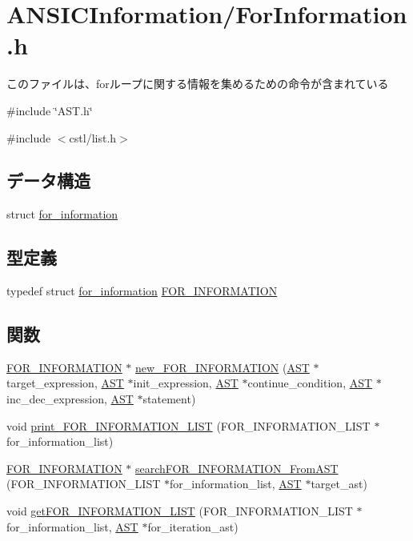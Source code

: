 \section{ANSICInformation/ForInformation.h}
\label{ForInformation_8h}


このファイルは、forループに関する情報を集めるための命令が含まれている  


{\ttfamily \#include \char`\"{}AST.h\char`\"{}}\par
{\ttfamily \#include $<$cstl/list.h$>$}\par
\subsection*{データ構造}
\begin{DoxyCompactItemize}
\item 
struct \hyperlink{structfor__information}{for\_\-information}
\end{DoxyCompactItemize}
\subsection*{型定義}
\begin{DoxyCompactItemize}
\item 
typedef struct \hyperlink{structfor__information}{for\_\-information} \hyperlink{ForInformation_8h_a2f30e4e2396ee1da23c3c282fbef2234}{FOR\_\-INFORMATION}
\end{DoxyCompactItemize}
\subsection*{関数}
\begin{DoxyCompactItemize}
\item 
\hyperlink{structfor__information}{FOR\_\-INFORMATION} $\ast$ \hyperlink{ForInformation_8h_a21a8cce7aba7cea3f56bbf3a6d84b14b}{new\_\-FOR\_\-INFORMATION} (\hyperlink{structabstract__syntax__tree}{AST} $\ast$target\_\-expression, \hyperlink{structabstract__syntax__tree}{AST} $\ast$init\_\-expression, \hyperlink{structabstract__syntax__tree}{AST} $\ast$continue\_\-condition, \hyperlink{structabstract__syntax__tree}{AST} $\ast$inc\_\-dec\_\-expression, \hyperlink{structabstract__syntax__tree}{AST} $\ast$statement)
\item 
void \hyperlink{ForInformation_8h_af3b7535a1754cb46702469bf0e1989b2}{print\_\-FOR\_\-INFORMATION\_\-LIST} (FOR\_\-INFORMATION\_\-LIST $\ast$for\_\-information\_\-list)
\item 
\hyperlink{structfor__information}{FOR\_\-INFORMATION} $\ast$ \hyperlink{ForInformation_8h_abd0a6a19cc86b9a0089eaca36dafaab2}{searchFOR\_\-INFORMATION\_\-FromAST} (FOR\_\-INFORMATION\_\-LIST $\ast$for\_\-information\_\-list, \hyperlink{structabstract__syntax__tree}{AST} $\ast$target\_\-ast)
\item 
void \hyperlink{ForInformation_8h_a2f25ff3d1088a97208582080fdae4d01}{getFOR\_\-INFORMATION\_\-LIST} (FOR\_\-INFORMATION\_\-LIST $\ast$for\_\-information\_\-list, \hyperlink{structabstract__syntax__tree}{AST} $\ast$for\_\-iteration\_\-ast)
\end{DoxyCompactItemize}


